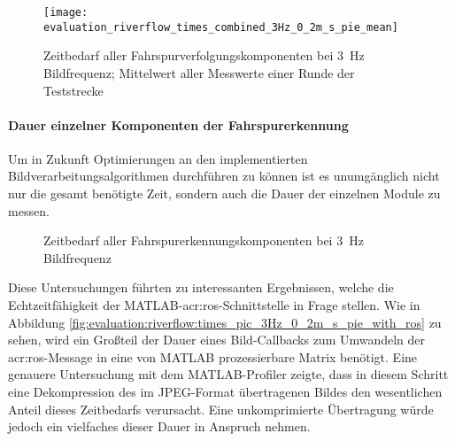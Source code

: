 \begin{figure}[htbp] %
	\centering
	\texttt{[image: evaluation\_riverflow\_times\_combined\_3Hz\_0\_2m\_s\_pie\_mean]}
	\label{fig:evaluation:riverflow:times_combined_3Hz_0_2m_s_pie_mean}
	\caption{Zeitbedarf aller Fahrspurverfolgungskomponenten bei \SI{3}{\hertz} Bildfrequenz; Mittelwert aller Messwerte einer Runde der Teststrecke}
\end{figure}

\paragraph{Dauer einzelner Komponenten der Fahrspurerkennung}
Um in Zukunft Optimierungen an den implementierten Bildverarbeitungsalgorithmen durchführen zu können ist es unumgänglich nicht nur die gesamt benötigte Zeit, sondern auch die Dauer der einzelnen Module zu messen.

\begin{figure}[htbp] %
	\centering
	\qquad
	\qquad
	\caption{Zeitbedarf aller Fahrspurerkennungskomponenten bei \SI{3}{\hertz} Bildfrequenz}
\end{figure}

Diese Untersuchungen führten zu interessanten Ergebnissen, welche die Echtzeitfähigkeit der MATLAB-\gls{acr:ros}-Schnittstelle in Frage stellen. Wie in Abbildung \ref{fig:evaluation:riverflow:times_pic_3Hz_0_2m_s_pie_with_ros} zu sehen, wird ein Großteil der Dauer eines Bild-Callbacks zum Umwandeln der \gls{acr:ros}-Message in eine von MATLAB prozessierbare Matrix benötigt. Eine genauere Untersuchung mit dem MATLAB-Profiler zeigte, dass in diesem Schritt eine Dekompression des im JPEG-Format übertragenen Bildes den wesentlichen Anteil dieses Zeitbedarfs verursacht. Eine unkomprimierte Übertragung würde jedoch ein vielfaches dieser Dauer in Anspruch nehmen.


